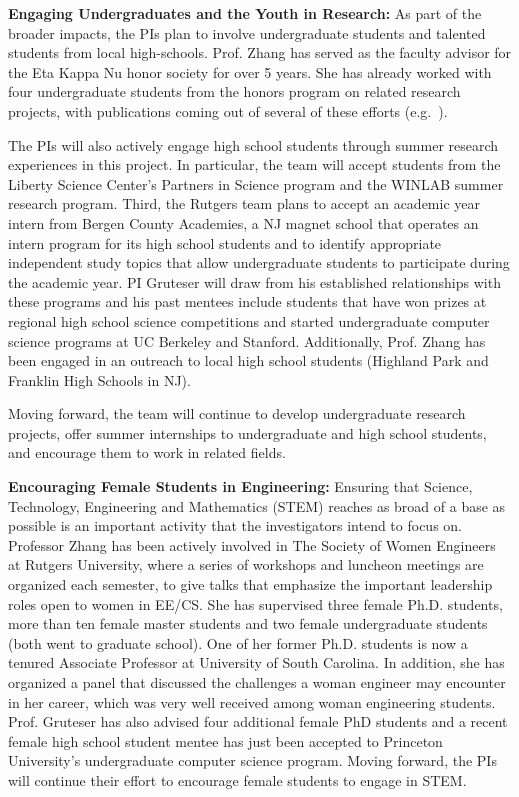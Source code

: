 \vspace{3pt}\noindent\textbf{Engaging Undergraduates and the Youth in Research:} As part of the broader impacts, the PIs plan to involve undergraduate students and talented students from local high-schools. Prof. Zhang has served as the faculty advisor for the Eta Kappa
Nu honor society for over 5 years. She has already worked with four undergraduate students from the honors program on related research projects, with publications coming out of several of these efforts (e.g.~\cite{jsspp03,sensorfusion05,xu:wise04,xu:mobihoc05}).

The PIs will also actively engage high school students through summer research experiences in this project. In particular, the team will accept students from the Liberty Science Center's Partners in Science program and the WINLAB summer research program. Third, the Rutgers team plans to accept an academic year intern from Bergen County Academies, a NJ magnet school that operates an intern program for its high school students and to identify appropriate independent study topics that allow undergraduate students to participate during the academic year. PI Gruteser will draw from his established relationships with these programs and his past mentees include students that have won prizes at regional high school science competitions and started undergraduate computer science programs at UC Berkeley and Stanford. Additionally, Prof. Zhang has been engaged in an outreach to local high school students (Highland Park and Franklin High Schools in NJ).

Moving forward, the team will continue to develop undergraduate research projects, offer summer internships to undergraduate and high school students, and encourage them to work in related fields.


\vspace{3pt}\noindent\textbf{Encouraging Female Students in Engineering:} Ensuring that Science, Technology, Engineering and Mathematics (STEM) reaches as broad of a base as possible is an important activity that the investigators intend to focus on.
Professor Zhang has been actively involved in The Society of Women Engineers at Rutgers
University, where a series of workshops and luncheon meetings are
organized each semester, to give talks that emphasize the important
leadership roles open to women in EE/CS. She has supervised three female Ph.D. students, more than ten female master students and two female undergraduate students (both went to graduate school). One of her former Ph.D. students is now a tenured Associate Professor at University of South Carolina.  In addition, she has
organized a panel that discussed the challenges a woman engineer may
encounter in her career, which was very well received among woman
engineering students. Prof. Gruteser has also advised four additional female PhD students and a recent female high school student mentee has just been accepted to Princeton University’s undergraduate computer science program. Moving forward, the PIs will continue their effort to encourage female students to engage in STEM.
\vspace{-8pt}
